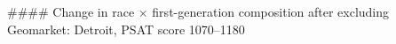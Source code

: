 #### Change in race × first-generation composition after excluding Geomarket: Detroit, PSAT score 1070–1180
